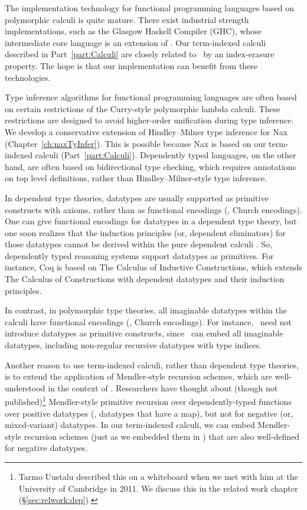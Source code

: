 The implementation technology for functional programming languages based on
polymorphic calculi is quite mature. There exist industrial
strength implementations, such as the Glasgow Haskell Compiler (GHC),
whose intermediate core language is an extension of \Fw.
Our term-indexed calculi described in Part~\ref{part:Calculi} are closely
related to \Fw\ by an index-erasure property. The hope is that
our implementation can benefit from these technologies.

Type inference algorithms for functional programming languages are often
based on certain restrictions of the Curry-style polymorphic lambda calculi.
These restrictions are designed to avoid higher-order unification during
type inference.
We develop a conservative extension of Hindley--Milner type inference for
Nax (Chapter~\ref{ch:naxTyInfer}). This is possible because Nax is based on our
term-indexed calculi (Part~\ref{part:Calculi}). Dependently typed languages,
on the other hand, are often based on bidirectional type checking, which
requires annotations on top level definitions, rather than
Hindley--Milner-style type inference.

In dependent type theories, datatypes are usually supported as primitive
constructs with axioms, rather than as functional encodings
(\eg, Church encodings). One can give functional encodings for datatypes
in a dependent type theory, but one soon realizes that the induction principles
(or, dependent eliminators) for those datatypes cannot be derived within
the pure dependent calculi \cite{Geuvers01}.
So, dependently typed reasoning systems support datatypes as primitives.
For instance, Coq is based on The Calculus of Inductive Constructions, which
extends The Calculus of Constructions \cite{CoqHue86} with dependent datatypes
and their induction principles.

In contrast, in polymorphic type theories, all imaginable datatypes
within the calculi have functional encodings (\eg, Church encodings).
For instance, \Fw\ need not introduce datatypes as primitive constructs,
since \Fw\ can embed all imaginable datatypes, including non-regular
recursive datatypes with type indices. 

Another reason to use term-indexed calculi, rather than dependent type theories,
is to extend the application of Mendler-style recursion schemes,
which are well-understood in the context of \Fw.
Researchers have thought about (though not published)\footnote{
     Tarmo Uustalu described this on a whiteboard
     when we met with him at the University of Cambridge in 2011.
     We discuss this in the related work chapter (\S\ref{sec:relwork:dep}).}
Mendler-style primitive recursion over dependently-typed functions
over positive datatypes (\ie, datatypes that have a map), but not for
negative (or, mixed-variant) datatypes. In our term-indexed calculi,
we can embed Mendler-style recursion schemes (just as we embedded them in \Fw)
that are also well-defined for negative datatypes.

